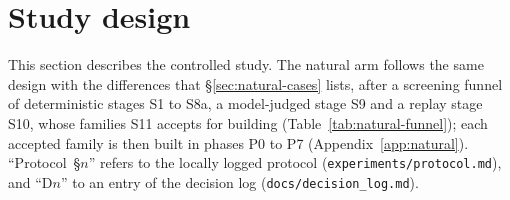 \section{Study design}
\label{sec:design}
This section describes the controlled study. The natural arm follows the same design with the differences that \S\ref{sec:natural-cases} lists, after a screening funnel of deterministic stages S1 to S8a, a model-judged stage S9 and a replay stage S10, whose families S11 accepts for building (Table~\ref{tab:natural-funnel}); each accepted family is then built in phases P0 to P7 (Appendix~\ref{app:natural}). ``Protocol~\S$n$'' refers to the locally logged protocol (\texttt{experiments/protocol.md}), and ``D$n$'' to an entry of the decision log (\texttt{docs/decision\_log.md}).

